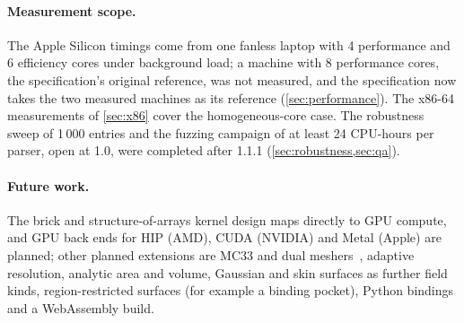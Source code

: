\paragraph{Measurement scope.}
The Apple Silicon timings come from one fanless laptop with 4 performance
and 6 efficiency cores under background load; a machine with 8 performance
cores, the specification's original reference, was not measured, and the
specification now takes the two measured machines as its reference
(\cref{sec:performance}). The x86-64 measurements of \cref{sec:x86} cover
the homogeneous-core case. The robustness sweep of 1\,000 entries and the
fuzzing campaign of at least 24 CPU-hours per parser, open at 1.0, were
completed after 1.1.1 (\cref{sec:robustness,sec:qa}).

\paragraph{Future work.}
The brick and structure-of-arrays kernel design maps directly to GPU
compute, and GPU back ends for HIP (AMD), CUDA (NVIDIA) and Metal (Apple)
are planned; other planned extensions are MC33 and dual
meshers~\cite{gibson1998,ju2002}, adaptive resolution, analytic area and
volume, Gaussian and skin surfaces as further field kinds, region-restricted
surfaces (for example a binding pocket), Python bindings and a WebAssembly
build.
